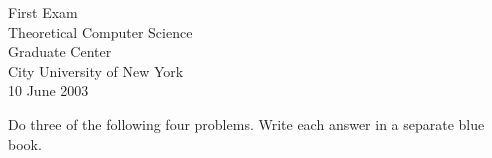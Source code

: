\documentclass[11pt]{article}
\begin{document}
{\bf\large
\begin{center}
	{\large First Exam}\\
        	Theoretical Computer Science\\
        	Graduate Center\\
	City University of New York\\
	10 June 2003
\end{center}
}


Do three of the following four problems.  Write each answer  in a separate
blue book.
\end{document}
